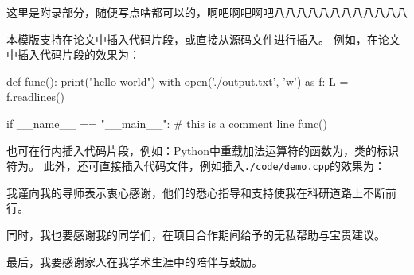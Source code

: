 \documentclass[a4paper]{ctexart}
\begin{document}




\makereferences





\begin{slsappendix}
    这里是附录部分，随便写点啥都可以的，啊吧啊吧啊吧八八八八八八八八八八八八

    
本模版支持在论文中插入代码片段，或直接从源码文件进行插入。
例如，在论文中插入代码片段的效果为：
\begin{python}
    def func():
    print("hello world")
    with open('./output.txt', 'w') as f:
    L = f.readlines()

    if __name__ == "__main__":
    # this is a comment line
    func()
\end{python}
也可在行内插入代码片段，例如：Python中重载加法运算符的函数为，类的标识符为。
此外，还可直接插入代码文件，例如插入\texttt{./code/demo.cpp}的效果为：





\end{slsappendix}



\begin{acknowledgments}
    我谨向我的导师表示衷心感谢，他们的悉心指导和支持使我在科研道路上不断前行。
    
    同时，我也要感谢我的同学们，在项目合作期间给予的无私帮助与宝贵建议。

    最后，我要感谢家人在我学术生涯中的陪伴与鼓励。

\end{acknowledgments}
\end{document}
